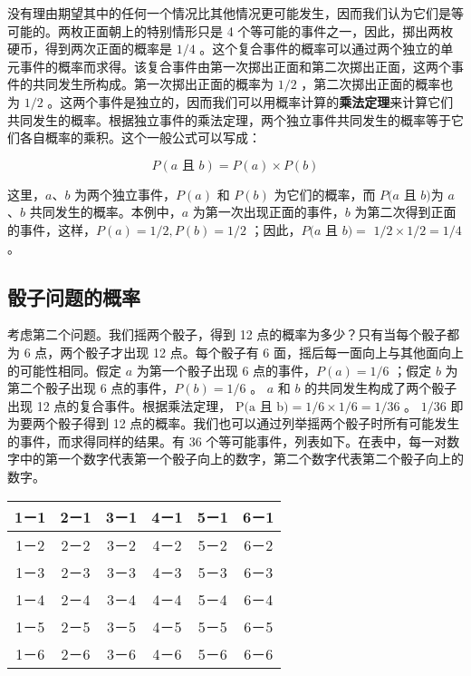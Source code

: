 没有理由期望其中的任何一个情况比其他情况更可能发生，因而我们认为它们是等可能的。两枚正面朝上的特别情形只是 4 个等可能的事件之一，因此，掷出两枚硬币，得到两次正面的概率是 $1 / 4$ 。这个复合事件的概率可以通过两个独立的单元事件的概率而求得。该复合事件由第一次掷出正面和第二次掷出正面，这两个事件的共同发生所构成。第一次掷出正面的概率为 $1 / 2$ ，第二次掷出正面的概率也为 $1 / 2$ 。这两个事件是独立的，因而我们可以用概率计算的\textbf{乘法定理}来计算它们共同发生的概率。根据独立事件的乘法定理，两个独立事件共同发生的概率等于它们各自概率的乘积。这个一般公式可以写成：

$$
P(a \text { 且 } b)=P(a) \times P(b)
$$

这里，$a$、$b$ 为两个独立事件，$P(a)$ 和 $P(b)$ 为它们的概率，而 $P(a$ 且 $b)$为 $a$、$b$ 共同发生的概率。本例中，$a$ 为第一次出现正面的事件，$b$ 为第二次得到正面的事件，这样，$P(a)=1 / 2, P(b)=1 / 2$ ；因此，$P(a$ 且 $b)=$ $1 / 2 \times 1 / 2=1 / 4$ 。

\subsection{骰子问题的概率}

考虑第二个问题。我们摇两个骰子，得到 12 点的概率为多少？只有当每个骰子都为 6 点，两个骰子才出现 12 点。每个骰子有 6 面，摇后每一面向上与其他面向上的可能性相同。假定 $a$ 为第一个骰子出现 6 点的事件，$P(a)=1 / 6$ ；假定 $b$ 为第二个骰子出现 6 点的事件，$P(b)=1 / 6$ 。 $a$ 和 $b$ 的共同发生构成了两个骰子出现 12 点的复合事件。根据乘法定理， $\mathrm{P}(\mathrm{a}$ 且 b$)=1 / 6 \times 1 / 6=1 / 36$ 。 $1 / 36$ 即为要两个骰子得到 12 点的概率。我们也可以通过列举摇两个骰子时所有可能发生的事件，而求得同样的结果。有 36 个等可能事件，列表如下。在表中，每一对数字中的第一个数字代表第一个骰子向上的数字，第二个数字代表第二个骰子向上的数字。

\begin{center}
\begin{tabular}{|c|c|c|c|c|c|}
\hline
1－1 & 2－1 & 3－1 & 4－1 & 5－1 & 6－1 \\
\hline
1－2 & 2－2 & 3－2 & 4－2 & 5－2 & 6－2 \\
\hline
1－3 & 2－3 & 3－3 & 4－3 & 5－3 & 6－3 \\
\hline
1－4 & 2－4 & 3－4 & 4－4 & 5－4 & 6－4 \\
\hline
1－5 & 2－5 & 3－5 & 4－5 & 5－5 & 6－5 \\
\hline
1－6 & 2－6 & 3－6 & 4－6 & 5－6 & 6－6 \\
\hline
\end{tabular}
\end{center}

